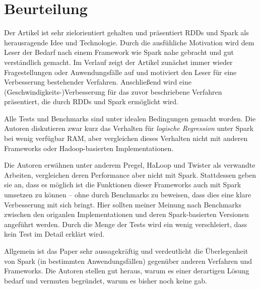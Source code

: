 \section{Beurteilung}

Der Artikel ist sehr zielorientiert gehalten und präsentiert RDDs und Spark als herausragende Idee und Technologie. Durch die ausfühliche Motivation wird dem Leser der Bedarf nach einem Framework wie Spark nahe gebracht und gut verständlich gemacht. Im Verlauf zeigt der Artikel zunächst immer wieder Fragestellungen oder Anwendungsfälle auf und motiviert den Leser für eine Verbesserung bestehender Verfahren. Anschließend wird eine (Geschwindigkeits-)Verbesserung für das zuvor beschriebene Verfahren präsentiert, die durch RDDs und Spark ermöglicht wird.

Alle Tests und Benchmarks sind unter idealen Bedingungen gemacht worden. Die Autoren diskutieren zwar kurz das Verhalten für \textit{logische Regression} unter Spark bei wenig verfügbar RAM, aber vergleichen dieses Verhalten nicht mit anderen Frameworks oder Hadoop-basierten Implementationen.

Die Autoren erwähnen unter anderem Pregel, HaLoop und Twister als verwandte Arbeiten, vergleichen deren Performance aber nicht mit Spark. Stattdessen geben sie an, dass es möglich ist die Funktionen dieser Frameworks auch mit Spark umsetzen zu können -- ohne durch Benchmarks zu beweisen, dass dies eine klare Verbesserung mit sich bringt. Hier sollten meiner Meinung nach Benchmarks zwischen den origanlen Implementationen und deren Spark-basierten Versionen angeführt werden. Durch die Menge der Tests wird ein wenig verschleiert, dass kein Test im Detail erklärt wird.

Allgemein ist das Paper sehr aussagekräftig und verdeutlicht die Überlegenheit von Spark (in bestimmten Anwendungsfällen) gegenüber anderen Verfahren und Frameworks. Die Autoren stellen gut heraus, warum es einer derartigen Lösung bedarf und vermuten begründet, warum es bisher noch keine gab.